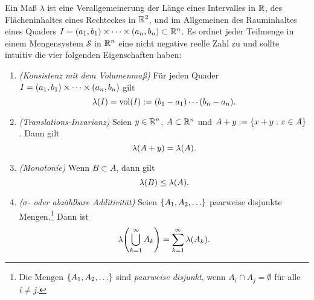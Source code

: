 Ein Maß \(\lambda\) ist eine Verallgemeinerung der Länge eines Intervalles in \(\R\), des Flächeninhaltes eines Rechteckes in \(\R^2\), und im Allgemeinen des Rauminhaltes eines Quaders \(I = \parentheses*{a_1, b_1} \times \cdots \times \parentheses*{a_n, b_n} \subset \R^n\).
Es ordnet jeder Teilmenge in einem Mengensystem \(\mathcal{S}\) in \(\R^n\) eine nicht negative reelle Zahl zu und sollte intuitiv die vier folgenden Eigenschaften haben:
\begin{enumerate}
	\item \emph{(Konsistenz mit dem Volumenmaß)} Für jeden Quader \(I = \parentheses*{a_1, b_1} \times \cdots \times \parentheses*{a_n, b_n}\) gilt
	\begin{equation}\label{eq:1-9}
		\lambda\parentheses*{I} = \vol\parentheses*{I} := \parentheses*{b_1 - a_1}\cdots\parentheses*{b_n - a_n}.
	\end{equation}
	\item \emph{(Translations-Invarianz)} Seien \(y \in \R^n\), \(A \subset \R^n\) und \(A + y := \braces*{x + y : x \in A}\).
	Dann gilt
	\begin{equation}
		\lambda\parentheses*{A + y} = \lambda\parentheses*{A}.
	\end{equation}
	\item \emph{(Monotonie)} Wenn \(B \subset A\), dann gilt
	\begin{equation}\label{eq:1-11}
		\lambda\parentheses*{B} \le \lambda\parentheses*{A}.
	\end{equation}
	\item \emph{(\(\sigma\)- oder abzählbare Additivität)} Seien \(\braces*{A_1, A_2, \ldots}\) paarweise disjunkte Mengen.\footnote{Die Mengen \(\braces*{A_1, A_2, \ldots}\) sind \emph{paarweise disjunkt}, wenn \(A_i \cap A_j = \emptyset\) für alle \(i \ne j\).}
	Dann ist
	\begin{equation}\label{eq:1-12}
		\lambda\parentheses*{\bigcup_{k = 1}^\infty A_k} = \sum_{k = 1}^\infty \lambda\parentheses*{A_k}.
	\end{equation}
\end{enumerate}

